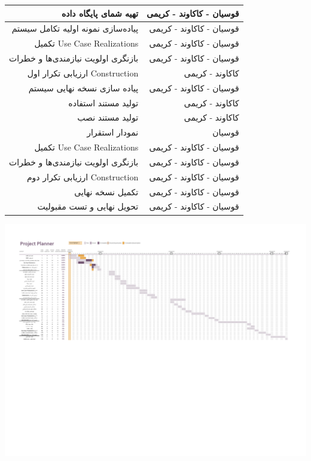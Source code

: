 \documentclass{article}
\begin{document}
\begin{tabular}{ | r | r | }
	تهیه شمای پایگاه داده & قوسیان - کاکاوند - کریمی \\ \hline
	پیاده‌سازی نمونه اولیه تکامل سیستم & قوسیان - کاکاوند - کریمی \\ \hline
	تکمیل Use Case Realizations & قوسیان - کاکاوند - کریمی \\ \hline
	بازنگری اولویت‌ نیازمندی‌ها و خطرات & قوسیان - کاکاوند - کریمی \\ \hline
	ارزیابی تکرار اول Construction & کاکاوند - کریمی \\ \hline
	 پیاده سازی نسخه نهایی سیستم & قوسیان - کاکاوند - کریمی \\ \hline
	 تولید مستند استفاده & کاکاوند - کریمی \\ \hline
	 تولید مستند نصب & کاکاوند - کریمی \\ \hline
	نمودار استقرار & قوسیان \\ \hline
	تکمیل Use Case Realizations & قوسیان - کاکاوند - کریمی \\ \hline
	بازنگری اولویت‌ نیازمندی‌ها و خطرات & قوسیان - کاکاوند - کریمی \\ \hline
	ارزیابی تکرار دوم Construction & قوسیان - کاکاوند - کریمی \\ \hline
	تکمیل نسخه نهایی & قوسیان - کاکاوند - کریمی \\ \hline
	تحویل نهایی و تست مقبولیت & قوسیان - کاکاوند - کریمی \\ \hline
\end{tabular}



\newpage
\eject \pdfpagewidth=350mm \pdfpageheight=200mm
\begin{center}
\includegraphics[width=300mm]{Gantt_v2.pdf}
\end{center}
\end{document}

